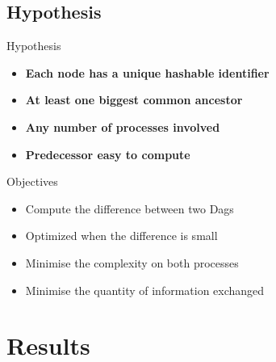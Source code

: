 \documentclass[10pt,xcolor={usenames,dvipsnames,svgnames,table}]{beamer}
\theoremstyle{definition}
\theoremstyle{definition}
\begin{document}
\subsection{Hypothesis}
\begin{frame}

\begin{alertblock}{Hypothesis}
 \begin{itemize}
 \item \textbf{Each node has a unique hashable identifier}
 \item \textbf{At least one biggest common ancestor}
 \item \textbf{Any number of processes involved}
 \item \textbf{Predecessor easy to compute}
\end{itemize}
\end{alertblock}

\begin{exampleblock}{Objectives}
 \begin{itemize}
 \item Compute the difference between two Dags
  \item Optimized when the difference is small
  \item Minimise the complexity on both processes
  \item Minimise the quantity of information exchanged
 \end{itemize}
\end{exampleblock}
\end{frame}

\section{Results}
\end{document}
